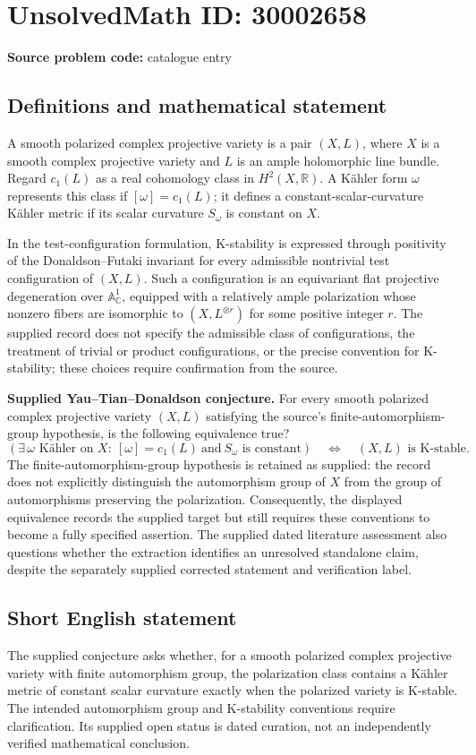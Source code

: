 \documentclass[11pt]{article}
\newcommand{\R}{\mathbb{R}}
\newcommand{\C}{\mathbb{C}}
\newcommand{\A}{\mathbb{A}}
\begin{document}
\section*{UnsolvedMath ID: 30002658}
\textbf{Source problem code:} catalogue entry
\subsection{Definitions and mathematical statement}
A smooth polarized complex projective variety is a pair \((X,L)\), where \(X\) is a smooth complex projective variety and \(L\) is an ample holomorphic line bundle. Regard \(c_1(L)\) as a real cohomology class in \(H^2(X,\R)\). A K\"ahler form \(\omega\) represents this class if \([\omega]=c_1(L)\); it defines a constant-scalar-curvature K\"ahler metric if its scalar curvature \(S_\omega\) is constant on \(X\).

In the test-configuration formulation, K-stability is expressed through positivity of the Donaldson--Futaki invariant for every admissible nontrivial test configuration of \((X,L)\). Such a configuration is an equivariant flat projective degeneration over \(\A^1_{\C}\), equipped with a relatively ample polarization whose nonzero fibers are isomorphic to \((X,L^{\otimes r})\) for some positive integer \(r\). The supplied record does not specify the admissible class of configurations, the treatment of trivial or product configurations, or the precise convention for K-stability; these choices require confirmation from the source.

\textbf{Supplied Yau--Tian--Donaldson conjecture.} For every smooth polarized complex projective variety \((X,L)\) satisfying the source's finite-automorphism-group hypothesis, is the following equivalence true?
\[
\left(\exists\,\omega\text{ K\"ahler on }X:\ [\omega]=c_1(L)\ \text{and}\ S_\omega\text{ is constant}\right)
\quad\Longleftrightarrow\quad
(X,L)\text{ is K-stable}.
\]
The finite-automorphism-group hypothesis is retained as supplied: the record does not explicitly distinguish the automorphism group of \(X\) from the group of automorphisms preserving the polarization. Consequently, the displayed equivalence records the supplied target but still requires these conventions to become a fully specified assertion. The supplied dated literature assessment also questions whether the extraction identifies an unresolved standalone claim, despite the separately supplied corrected statement and verification label.
\subsection{Short English statement}
The supplied conjecture asks whether, for a smooth polarized complex projective variety with finite automorphism group, the polarization class contains a K\"ahler metric of constant scalar curvature exactly when the polarized variety is K-stable. The intended automorphism group and K-stability conventions require clarification. Its supplied open status is dated curation, not an independently verified mathematical conclusion.
\end{document}
